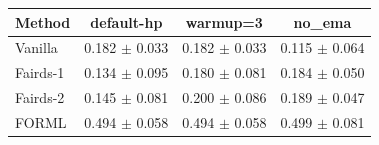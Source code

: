 \begin{tabular}{lccc}
\toprule
Method & default-hp & warmup=3 & no\_ema \\
\midrule
Vanilla & 0.182 $\pm$ 0.033 & 0.182 $\pm$ 0.033 & 0.115 $\pm$ 0.064 \\
Fairds-1 & 0.134 $\pm$ 0.095 & 0.180 $\pm$ 0.081 & 0.184 $\pm$ 0.050 \\
Fairds-2 & 0.145 $\pm$ 0.081 & 0.200 $\pm$ 0.086 & 0.189 $\pm$ 0.047 \\
FORML & 0.494 $\pm$ 0.058 & 0.494 $\pm$ 0.058 & 0.499 $\pm$ 0.081 \\
\bottomrule
\end{tabular}